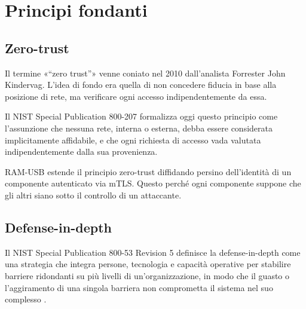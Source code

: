 \chapter{Principi fondanti}
\label{chap:principi-fondanti}

\section{Zero-trust}
\label{sec:sota-zero-trust}

Il termine «``zero trust''» venne coniato nel 2010 dall'analista Forrester John Kindervag. L'idea di fondo 
era quella di non concedere fiducia in base alla posizione di rete, ma verificare ogni accesso
indipendentemente da essa.

Il NIST Special Publication 800-207 \cite{nist-sp-800-207} formalizza oggi questo principio come l'assunzione che nessuna rete,
interna o esterna, debba essere considerata implicitamente affidabile, e che ogni richiesta di accesso
vada valutata indipendentemente dalla sua provenienza.

RAM-USB estende il principio zero-trust diffidando persino dell'identità di un componente autenticato via mTLS. 
Questo perché ogni componente suppone che gli altri siano sotto il controllo di un attaccante.


\section{Defense-in-depth}
\label{sec:sota-defence-in-depth}

Il NIST Special Publication 800-53 Revision 5 definisce la defense-in-depth come una strategia che integra 
persone, tecnologia e capacità operative per stabilire barriere ridondanti su più livelli di 
un'organizzazione, in modo che il guasto o l'aggiramento di una singola barriera non comprometta il sistema 
nel suo complesso \cite{nist-sp-800-53r5}.